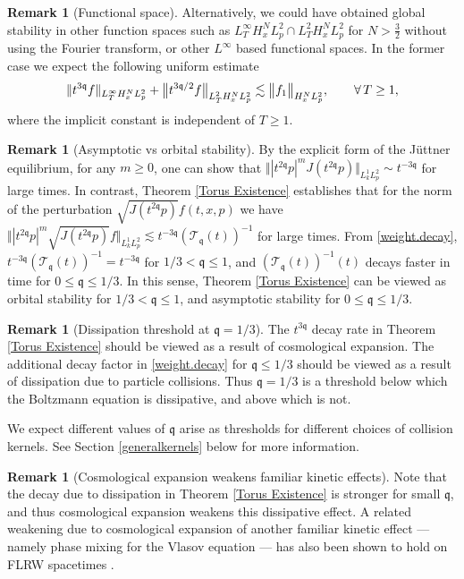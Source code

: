 \documentclass[reqno]{amsart}
\newcommand{\pv}{p}
\def\norm#1{\big\Vert#1\big\Vert}
\newcommand{\qq}{\mathfrak{q}}
\newcommand{\tTq}{t^{3\qq}}
\newcommand{\tmTq}{t^{-3\qq}}
\newcommand{\tw}{\mathcal{T}_{\qq}}
\theoremstyle{definition}
\newtheorem{remark}[theorem]{Remark}
\numberwithin{equation}{section}
\numberwithin{theorem}{section}
\begin{document}
\begin{remark}[Functional space]\label{rmfcnspc}
Alternatively, we could have obtained global stability in other function spaces such as
$L^\infty_T H^N_x L^2_p \cap L^2_T H^N_x L^2_p$ for $N> \frac{3}{2}$ without using the Fourier transform, or other \(L^{\infty}_{}\) based functional spaces. In the former case we expect the following uniform estimate
\begin{align}\notag
  {\Vert{\tTq f}\Vert_{L^\infty_T H^N_xL^2_{\pv}}}
+
{\norm{t^{3\qq/2} f}_{L^2_TH^N_xL^2_{\pv}}}
\lesssim 
\norm{ {f}_1}_{H^N_x L^2_{\pv}},
\qquad  
\forall \,T\geq 1,
\end{align}
where the implicit constant is independent of $T \geq 1$.  
\end{remark}

\begin{remark}[Asymptotic vs orbital stability] By the explicit form of the J\"uttner equilibrium, for any $m\ge 0$, one can show that \({\Vert{ |t^{2\qq}p|^mJ(t^{2\qq}p)}\Vert_{L^1_kL^2_{\pv}}} \sim \tmTq\) for large times. In contrast, Theorem \ref{Torus Existence} establishes that for the norm of the perturbation \(\sqrt{J(t^{2\qq}\pv)}f(t, x, \pv)\) we have  \({\Vert{ |t^{2\qq}p|^m\sqrt{J(t^{2\qq}p)}f}\Vert_{L^1_kL^2_{\pv}}} \lesssim \tmTq (\tw(t))^{-1}\) for large times.  From \eqref{weight.decay}, $\tmTq (\tw(t))^{-1} = \tmTq$  for \(1/3<\qq\leq 1\), and $(\tw(t))^{-1}(t)$ decays faster in time for \(0\leq \qq\leq 1/3\). In this sense, Theorem \ref{Torus Existence} can be viewed as  orbital stability for \(1/3<\qq\leq 1\), and asymptotic stability for \(0\leq \qq\leq 1/3\).
\end{remark}

\begin{remark}[Dissipation threshold at \(\qq=1/3\)]\label{rmkdissthres}
The \(t^{3\qq}\) decay rate in Theorem \ref{Torus Existence} should be viewed as a result of cosmological expansion. The additional decay factor in \eqref{weight.decay} for \(\qq\leq 1/3\) should be viewed as a result of dissipation due to particle collisions. Thus \(\qq=1/3\) is a threshold below which the Boltzmann equation is dissipative, and above which is not.


We expect different values of \(\qq\) arise as thresholds for different choices of collision kernels. See Section \ref{generalkernels} below for more information.
\end{remark}



\begin{remark}[Cosmological expansion weakens familiar kinetic effects] \label{rmk:Vlasovmixing}
    Note that the decay due to dissipation in Theorem \ref{Torus Existence} is stronger for small \(\qq\), and thus cosmological expansion weakens this dissipative effect. A related weakening due to cosmological expansion of another familiar kinetic effect --- namely phase mixing for the Vlasov equation --- has also been shown to hold on FLRW spacetimes \cite{TaylorVelozo2025}.
\end{remark}
\end{document}
